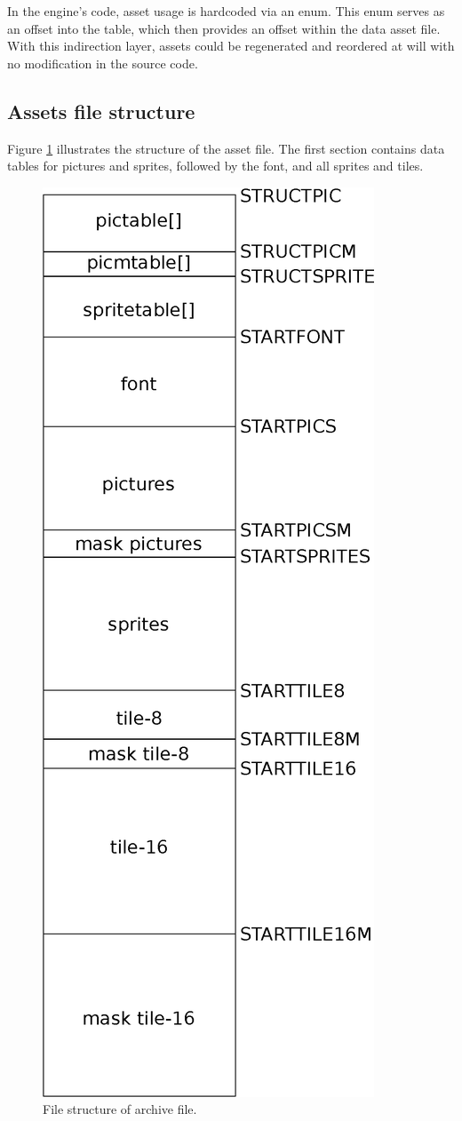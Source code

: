 \documentclass[book.tex]{subfiles}
\begin{document}
\par
In the engine's code, asset usage is hardcoded via an enum. This enum serves as an offset into the  table, which then provides an offset within the data asset file. With this indirection layer, assets could be regenerated and reordered at will with no modification in the source code.\\



\par
\begin{minipage}{\textwidth}
 \par
 \end{minipage}
  

\subsection{Assets file structure}
\label{section:asset_file_structure}
Figure \ref{fig:asset-file} illustrates the structure of the  asset file. The first section contains data tables for pictures and sprites, followed by the font, and all sprites and tiles. 

\begin{figure}[H]
\centering
 \includegraphics[width=.4\textwidth]{imgs/drawings/graphic_assets.eps}
 \caption{File structure of  archive file.}
 \label{fig:asset-file}
\end{figure}
\end{document}
